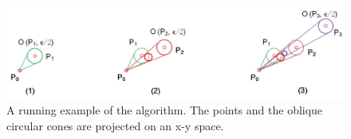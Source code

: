 

\begin{figure}[tb!]
	\centering
	\includegraphics[scale=0.66]{Figures/Fig-Conest.jpg}
	\vspace{-1ex}
	\caption{\small A running example of the \cised algorithm. The points and the oblique circular cones are projected on an x-y space. }%
	\vspace{-2ex}
	\label{fig:exm-conest}
\end{figure}

